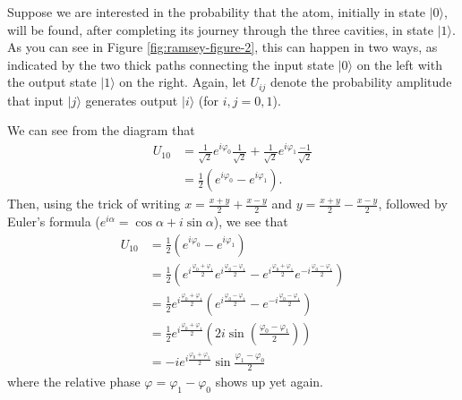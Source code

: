\documentclass[fleqn,a4paper]{article}
\theoremstyle{definition}
\theoremstyle{definition}
\theoremstyle{definition}
\theoremstyle{definition}
\theoremstyle{remark}
\begin{document}
Suppose we are interested in the probability that the atom, initially in state \(|0\rangle\), will be found, after completing its journey through the three cavities, in state \(|1\rangle\).
As you can see in Figure \ref{fig:ramsey-figure-2}, this can happen in two ways, as indicated by the two thick paths connecting the input state \(|0\rangle\) on the left with the output state \(|1\rangle\) on the right.
Again, let \(U_{ij}\) denote the probability amplitude that input \(|j\rangle\) generates output \(|i\rangle\) (for \(i,j=0,1\)).

We can see from the diagram that
\[
  \begin{aligned}
    U_{10}
    &= \frac{1}{\sqrt{2}} e^{i\varphi_0}\frac{1}{\sqrt{2}} + \frac{1}{\sqrt{2}} e^{i\varphi_1}\frac{-1}{\sqrt{2}}
  \\&= \frac{1}{2} \left(e^{i\varphi_0}-e^{i\varphi_1}\right).
  \end{aligned}
\]
Then, using the trick of writing \(x=\frac{x+y}{2}+\frac{x-y}{2}\) and \(y=\frac{x+y}{2}-\frac{x-y}{2}\), followed by Euler's formula (\(e^{i\alpha}=\cos\alpha+i\sin\alpha\)), we see that
\[
\begin{aligned}
U_{10}
&= \frac{1}{2} \left(e^{i\varphi_0}-e^{i\varphi_1}\right)
\\&= \frac{1}{2}\left( e^{i\frac{\varphi_0+\varphi_1}{2}}e^{i\frac{\varphi_0-\varphi_1}{2}} - e^{i\frac{\varphi_0+\varphi_1}{2}}e^{-i\frac{\varphi_0-\varphi_1}{2}}\right)
\\&= \frac{1}{2} e^{i\frac{\varphi_0+\varphi_1}{2}} \left( e^{i\frac{\varphi_0-\varphi_1}{2}} - e^{-i\frac{\varphi_0-\varphi_1}{2}}\right)
\\&= \frac{1}{2} e^{i\frac{\varphi_0+\varphi_1}{2}} \left( 2i \sin\left(\frac{\varphi_0 - \varphi_1}{2}\right) \right)
\\&= -ie^{i\frac{\varphi_0+\varphi_1}{2}}\sin\frac{\varphi_1-\varphi_0}{2}
\end{aligned}
\]
where the relative phase \(\varphi=\varphi_1-\varphi_0\) shows up yet again.
\end{document}
